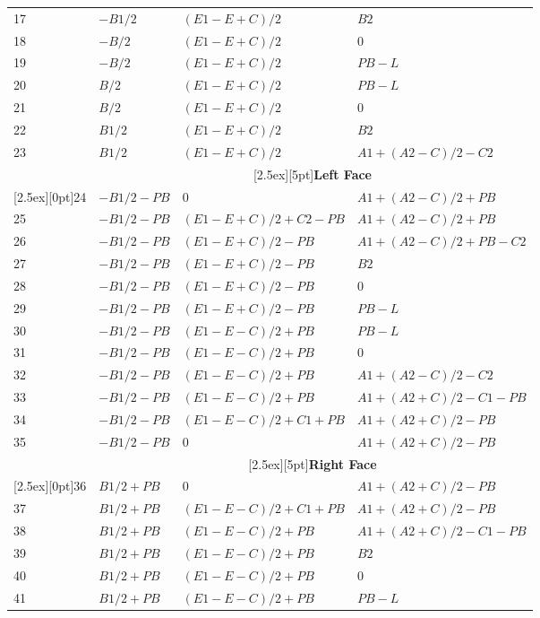 \documentclass[a4paper]{article}
\begin{document}
\begin{longtable}{|l|l|l|l|}
17 & $-B1/2$   & $(E1-E+C)/2$        & $B2$\\
18 & $-B/2$    & $(E1-E+C)/2$        & $0$\\
19 & $-B/2$    & $(E1-E+C)/2$        & $PB-L$\\
20 & $B/2$     & $(E1-E+C)/2$        & $PB-L$\\
21 & $B/2$     & $(E1-E+C)/2$        & $0$\\
22 & $B1/2$    & $(E1-E+C)/2$        & $B2$\\
23 & $B1/2$    & $(E1-E+C)/2$        & $A1+(A2-C)/2-C2$\\
\cline{2-4}
&\multicolumn{3}{|c|}{\raisebox{0pt}[2.5ex][5pt]{\textbf{Left Face}}}\\\cline{2-4}
\raisebox{0pt}[2.5ex][0pt]{24}
   & $-B1/2-PB$ & $0$                & $A1+(A2-C)/2+PB$\\
25 & $-B1/2-PB$ & $(E1-E+C)/2+C2-PB$ & $A1+(A2-C)/2+PB$\\
26 & $-B1/2-PB$ & $(E1-E+C)/2-PB$    & $A1+(A2-C)/2+PB-C2$\\
27 & $-B1/2-PB$ & $(E1-E+C)/2-PB$    & $B2$\\
28 & $-B1/2-PB$ & $(E1-E+C)/2-PB$    & $0$\\
29 & $-B1/2-PB$ & $(E1-E+C)/2-PB$    & $PB-L$\\
30 & $-B1/2-PB$ & $(E1-E-C)/2+PB$    & $PB-L$\\
31 & $-B1/2-PB$ & $(E1-E-C)/2+PB$    & $0$\\
32 & $-B1/2-PB$ & $(E1-E-C)/2+PB$    & $A1+(A2-C)/2-C2$\\
33 & $-B1/2-PB$ & $(E1-E-C)/2+PB$    & $A1+(A2+C)/2-C1-PB$\\
34 & $-B1/2-PB$ & $(E1-E-C)/2+C1+PB$ & $A1+(A2+C)/2-PB$\\
35 & $-B1/2-PB$ & $0$                & $A1+(A2+C)/2-PB$\\
\cline{2-4}
&\multicolumn{3}{|c|}{\raisebox{0pt}[2.5ex][5pt]{\textbf{Right Face}}}\\\cline{2-4}
\raisebox{0pt}[2.5ex][0pt]{36}
   & $B1/2+PB$  & $0$                & $A1+(A2+C)/2-PB$\\
37 & $B1/2+PB$  & $(E1-E-C)/2+C1+PB$ & $A1+(A2+C)/2-PB$\\
38 & $B1/2+PB$  & $(E1-E-C)/2+PB$    & $A1+(A2+C)/2-C1-PB$\\
39 & $B1/2+PB$  & $(E1-E-C)/2+PB$    & $B2$\\
40 & $B1/2+PB$  & $(E1-E-C)/2+PB$    & $0$\\
41 & $B1/2+PB$  & $(E1-E-C)/2+PB$    & $PB-L$\\

\end{longtable}
\end{document}
